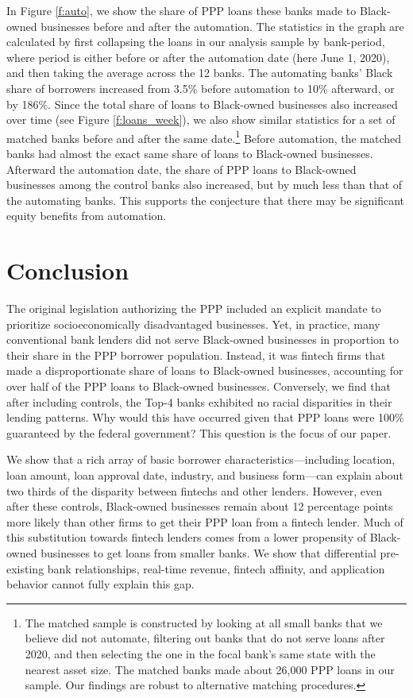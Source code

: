 \documentclass[11pt]{article}
\begin{document}
\noindent In Figure \ref{f:auto}, we show the share of PPP loans these banks made to Black-owned businesses before and after the automation. The statistics in the graph are calculated by first collapsing the loans in our analysis sample by bank-period, where period is either before or after the automation date (here June 1, 2020), and then taking the average across the 12 banks. The automating banks' Black share of borrowers increased from 3.5\% before automation to 10\% afterward, or by 186\%. Since the total share of loans to Black-owned businesses also increased over time (see Figure \ref{f:loans_week}), we also show similar statistics for a set of matched banks before and after the same date.\footnote{The matched sample is constructed by looking at all small banks that we believe did not automate, filtering out banks that do not serve loans after 2020, and then selecting the one in the focal bank's same state with the nearest asset size. The matched banks made about 26,000 PPP loans in our sample. Our findings are robust to alternative matching procedures.} Before automation, the matched banks had almost the exact same share of loans to Black-owned businesses. Afterward the automation date, the share of PPP loans to Black-owned businesses among the control banks also increased, but by much less than that of the automating banks. This supports the conjecture that there may be significant equity benefits from automation.


\section{Conclusion}

The original legislation authorizing the PPP included an explicit mandate to prioritize socioeconomically disadvantaged businesses. Yet, in practice, many conventional bank lenders did not serve Black-owned businesses in proportion to their share in the PPP borrower population. Instead, it was fintech firms that made a disproportionate share of loans to Black-owned businesses, accounting for over half of the PPP loans to Black-owned businesses. Conversely, we find that after including controls, the Top-4 banks exhibited no racial disparities in their lending patterns. Why would this have occurred given that PPP loans were 100\% guaranteed by the federal government? This question is the focus of our paper. 

We show that a rich array of basic borrower characteristics---including location, loan amount, loan approval date, industry, and business form---can explain about two thirds of the disparity between fintechs and other lenders. However, even after these controls, Black-owned businesses remain about 12 percentage points more likely than other firms to get their PPP loan from a fintech lender. Much of this substitution towards fintech lenders comes from a lower propensity of Black-owned businesses to get loans from smaller banks. We show that differential pre-existing bank relationships, real-time revenue, fintech affinity, and application behavior cannot fully explain this gap. 
\end{document}
